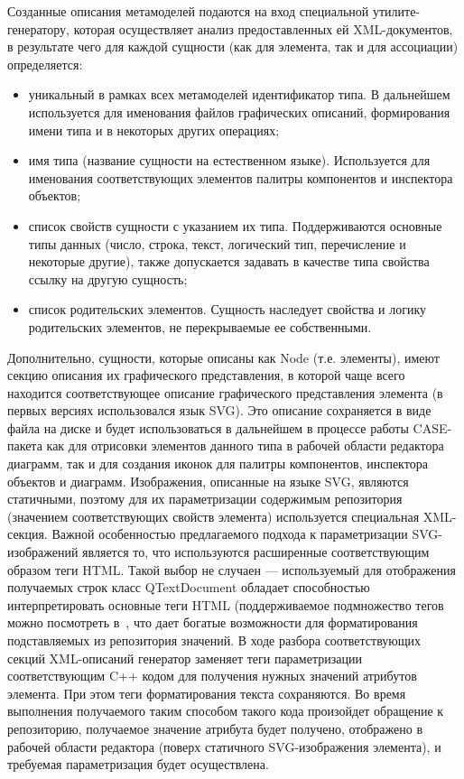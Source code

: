 \documentclass[a5paper]{article}
\begin{document}
Созданные описания метамоделей подаются на вход специальной
утилите-генератору, которая осуществляет анализ предоставленных ей
XML-документов, в результате чего для
каждой сущности (как для элемента, так и для ассоциации) определяется:

\begin{itemize}
  \item уникальный в рамках всех метамоделей идентификатор типа. В дальнейшем
        используется для именования файлов графических описаний, формирования
        имени типа и в некоторых других операциях;
  \item имя типа (название сущности на естественном языке). Используется для
        именования соответствующих элементов палитры компонентов и инспектора
        объектов;
  \item список свойств сущности с указанием их типа. Поддерживаются основные
        типы данных (число, строка, текст, логический тип, перечисление и
        некоторые другие), также допускается задавать в качестве типа свойства
        ссылку на другую сущность;
  \item список родительских элементов. Сущность наследует свойства и логику
        родительских элементов, не перекрываемые ее собственными.
\end{itemize}

Дополнительно, сущности, которые описаны как
Node (т.е. элементы), имеют секцию описания
их графического представления, в которой чаще всего находится
соответствующее описание графического представления элемента (в первых
версиях использовался язык SVG). Это
описание сохраняется в виде файла на диске и будет использоваться в
дальнейшем в процессе работы CASE-пакета
как для отрисовки элементов данного типа в рабочей области редактора
диаграмм, так и для создания иконок для палитры компонентов, инспектора
объектов и диаграмм. Изображения, описанные на языке SVG, являются статичными, поэтому для их
параметризации содержимым репозитория (значением соответствующих
свойств элемента) используется специальная
XML-секция. Важной особенностью предлагаемого подхода к параметризации
SVG-изображений является то, что используются расширенные соответствующим образом теги
HTML. Такой выбор не случаен --- используемый
для отображения получаемых строк класс QTextDocument обладает способностью
интерпретировать основные теги HTML
(поддерживаемое подмножество тегов можно посмотреть в~\cite{htmlInQt}, что дает
богатые возможности для форматирования подставляемых из репозитория
значений. В ходе разбора соответствующих секций XML-описаний генератор заменяет теги
параметризации соответствующим C++ кодом для
получения нужных значений атрибутов элемента. При этом теги
форматирования текста сохраняются. Во время выполнения получаемого
таким способом такого кода произойдет обращение к репозиторию,
получаемое значение атрибута будет получено, отображено в рабочей
области редактора (поверх статичного SVG-изображения элемента), и требуемая
параметризация будет осуществлена.
\end{document}
